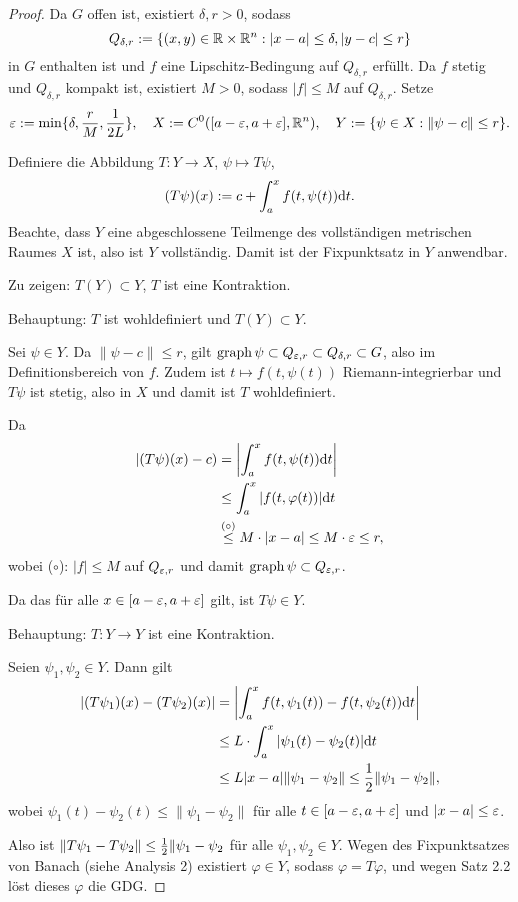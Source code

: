 \begin{proof}
  Da $G$ offen ist, existiert $\delta, r > 0 $, sodass
  \[ Q_{\delta,r} := \{ (x,y) \in \mathbb{R} \times \mathbb{R}^n : |x-a| \le \delta,
    |y-c| \le r \} \]
  in $G$ enthalten ist und $f$ eine Lipschitz-Bedingung auf $Q_{\delta,r}$
  erfüllt. Da $f$ stetig und $Q_{\delta,r}$ kompakt ist, existiert $M > 0$,
  sodass $|f| \le M$ auf $Q_{\delta,r}$. Setze
  \[ \varepsilon := \min \{ \delta, \frac{r}{M}, \frac{1}{2L} \},
    \quad X := C^0([a-\varepsilon,a+\varepsilon], \mathbb{R}^n),
    \quad Y := \{ \psi \in X: \|\psi - c\| \le r \}. \]

  Definiere die Abbildung $T:Y \to X$, $\psi \mapsto T\psi$,
  \[ (T\psi)(x) := c + \int_a^x f(t,\psi(t)) \mathrm{d} t. \]
  Beachte, dass $Y$ eine abgeschlossene Teilmenge des vollständigen metrischen
  Raumes $X$ ist, also ist $Y$ vollständig. Damit ist der Fixpunktsatz in $Y$
  anwendbar.

  Zu zeigen: $T(Y) \subset Y$, $T$ ist eine Kontraktion.

  Behauptung: $T$ ist wohldefiniert und $T(Y) \subset Y$.

  Sei $\psi \in Y$. Da $\| \psi - c \| \le r$, gilt $\operatorname{graph} \psi
  \subset Q_{\varepsilon,r} \subset Q_{\delta,r} \subset G$, also im
  Definitionsbereich von $f$. Zudem ist $t \mapsto f(t, \psi(t))$
  Riemann-integrierbar und $T\psi$ ist stetig, also in $X$ und damit ist $T$
  wohldefiniert.

  Da
  \begin{align*}
    | (T\psi)(x) - c )
    &= \left| \int_a^x f(t,\psi(t)) \mathrm{d} t  \right| \\
    &\le \int_a^x |f(t,\varphi(t))| \mathrm{d} t \\
    &\overset{(\circ)}{\le} M \cdot |x-a| \le M \cdot \varepsilon \le r,
  \end{align*}
  wobei ($\circ$): $|f| \le M$ auf $Q_{\varepsilon,r}$ und damit $\operatorname{graph}
  \psi \subset Q_{\varepsilon,r}$.

  Da das für alle $x \in [a-\varepsilon,a+\varepsilon]$ gilt, ist $T \psi \in Y$.

  Behauptung: $T: Y \to Y$ ist eine Kontraktion.

  Seien $\psi_1, \psi_2 \in Y$. Dann gilt
  \begin{align*}
    |(T\psi_1)(x) - (T\psi_2)(x) |
    &= \left| \int_a^x f(t,\psi_1(t)) - f(t,\psi_2(t)) \mathrm{d} t \right| \\
    &\le L \cdot \int_a^x | \psi_1(t) - \psi_2(t) | \mathrm{d} t \\
    &\le L |x-a| \| \psi_1 - \psi_2 \| \le \frac{1}{2} \| \psi_1 - \psi_2 \|,
  \end{align*}
  wobei $\psi_1(t) - \psi_2(t) \le \| \psi_1 - \psi_2 \|$ für alle $t \in
  [a-\varepsilon,a+\varepsilon]$ und $|x-a| \le \varepsilon$.

  Also ist $\| T\psi_1 - T\psi_2 \| \le \frac{1}{2} \| \psi_1 - \psi_2$ für alle
  $\psi_1, \psi_2 \in Y$. Wegen des Fixpunktsatzes von Banach (siehe Analysis 2)
  existiert $\varphi \in Y$, sodass $\varphi = T \varphi$, und wegen Satz 2.2
  löst dieses $\varphi$ die GDG.
\end{proof}

